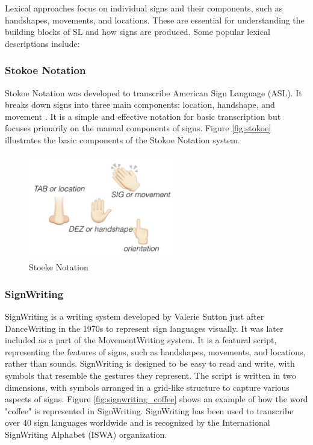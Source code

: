 \documentclass[../../main.tex]{subfiles}
\begin{document}
Lexical approaches focus on individual signs and their components, such as handshapes, movements, and locations. These are essential for understanding the building blocks of SL and how signs are produced. Some popular lexical descriptions include:

\subsubsection{Stokoe Notation}
\label{subsubsec:stokoe_notation}

Stokoe Notation\cite{stokoe1980sign} was developed to transcribe American Sign Language (ASL). It breaks down signs into three main components: location, handshape, and movement \cite{fig:stoeke}. It is a simple and effective notation for basic transcription but focuses primarily on the manual components of signs. Figure \ref{fig:stokoe} illustrates the basic components of the Stokoe Notation system.

\begin{figure}
  \centering \includegraphics[width = 2.5in]{chapters/background_work/images/stokoe.png}
  \caption{Stoeke Notation}
  \label{fig:stoeke}
\end{figure}

\subsubsection{SignWriting}
\label{subsubsec:signwriting}

SignWriting is a writing system developed by Valerie Sutton just after DanceWriting\cite{sutton1973sutton} in the 1970s to represent sign languages visually. It was later included as a part of the MovementWriting system. It is a featural script, representing the features of signs, such as handshapes, movements, and locations, rather than sounds. SignWriting is designed to be easy to read and write, with symbols that resemble the gestures they represent. The script is written in two dimensions, with symbols arranged in a grid-like structure to capture various aspects of signs. Figure \ref{fig:signwriting_coffee} shows an example of how the word "coffee" is represented in SignWriting. SignWriting has been used to transcribe over 40 sign languages worldwide and is recognized by the International SignWriting Alphabet (ISWA) organization.
\end{document}
